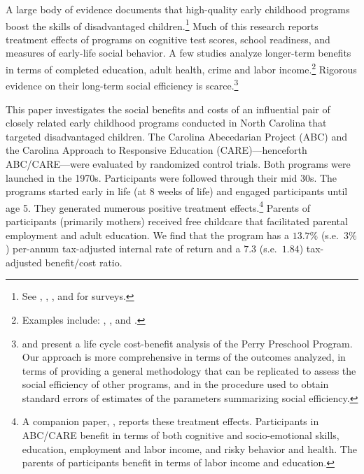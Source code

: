 \noindent A large body of evidence documents that high-quality early childhood programs boost the skills of disadvantaged children.\footnote{See \citet{Cunha_Heckman_ea_2006_HEE}, \citet{Almond-Currie_2011_JEP}, \citet{Duncan_Magnuson_2013_JEP}, and \citet{Elango_Hojman_etal_2016_Early-Edu} for surveys.} Much of this research reports treatment effects of programs on cognitive test scores, school readiness, and measures of early-life social behavior. A few studies analyze longer-term benefits in terms of completed education, adult health, crime and labor income.\footnote{Examples include: \citet{Heckman_Moon_etal_2010_QE}, \citet{Havnes_Mogstad_2011_AEJEP}, and \citet{Campbell_Conti_etal_2014_EarlyChildhoodInvestments}.} Rigorous evidence on their long-term social efficiency is scarce.\footnote{\citet{Belfield_Nores_etal_2006_JHR} and \citet{Heckman_Moon_etal_2010_RateofReturn} present a life cycle cost-benefit analysis of the Perry Preschool Program. Our approach is more comprehensive in terms of the outcomes analyzed, in terms of providing a general methodology that can be replicated to assess the social efficiency of other programs, and in the procedure used to obtain standard errors of estimates of the parameters summarizing social efficiency.}

This paper investigates the social benefits and costs of an influential pair of closely related early childhood programs conducted in North Carolina that targeted disadvantaged children. The Carolina Abecedarian Project (ABC) and the Carolina Approach to Responsive Education (CARE)---henceforth ABC/CARE---were evaluated by randomized control trials. Both programs were launched in the 1970s. Participants were followed through their mid 30s. The programs started early in life (at 8 weeks of life) and engaged participants until age 5. They generated numerous positive treatment effects.\footnote{A companion paper, \citet{Garcia_Heckman_Ziff_2018_EER}, reports these treatment effects. Participants in ABC/CARE benefit in terms of both cognitive and socio-emotional skills, education, employment and labor income, and risky behavior and health. The parents of participants benefit in terms of labor income and education.} Parents of participants (primarily mothers) received free childcare that facilitated parental employment and adult education. We find that the program has a $13.7\%$ (s.e.\ $3\%$) per-annum tax-adjusted internal rate of return and a $7.3$ (s.e.\ $1.84$) tax-adjusted benefit/cost ratio.

